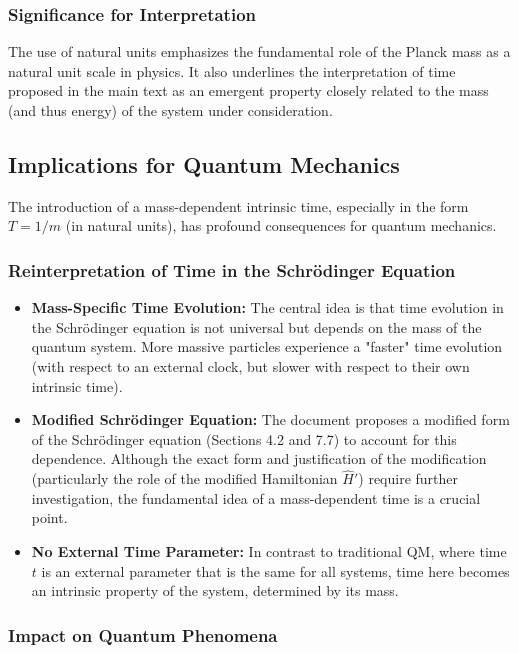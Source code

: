 \documentclass{article}
\begin{document}
\subsubsection{Significance for Interpretation}

The use of natural units emphasizes the fundamental role of the Planck mass as a natural unit scale in physics. It also underlines the interpretation of time proposed in the main text as an emergent property closely related to the mass (and thus energy) of the system under consideration.

\subsection{Implications for Quantum Mechanics}

The introduction of a mass-dependent intrinsic time, especially in the form \(T = 1/m\) (in natural units), has profound consequences for quantum mechanics.

\subsubsection{Reinterpretation of Time in the Schrödinger Equation}

\begin{itemize}
\item \textbf{Mass-Specific Time Evolution:} The central idea is that time evolution in the Schrödinger equation is not universal but depends on the mass of the quantum system. More massive particles experience a "faster" time evolution (with respect to an external clock, but slower with respect to their own intrinsic time).
\item \textbf{Modified Schrödinger Equation:} The document proposes a modified form of the Schrödinger equation (Sections 4.2 and 7.7) to account for this dependence. Although the exact form and justification of the modification (particularly the role of the modified Hamiltonian \(\hat{H}'\)) require further investigation, the fundamental idea of a mass-dependent time is a crucial point.
\item \textbf{No External Time Parameter:} In contrast to traditional QM, where time \(t\) is an external parameter that is the same for all systems, time here becomes an intrinsic property of the system, determined by its mass.
\end{itemize}

\subsubsection{Impact on Quantum Phenomena}
\end{document}
